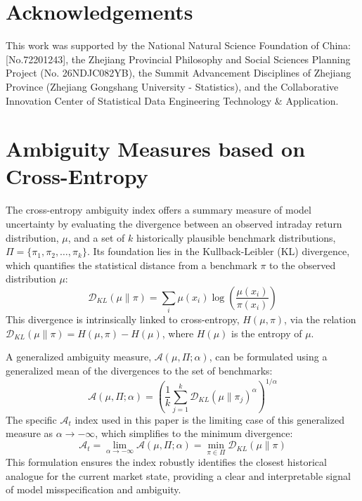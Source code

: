 \documentclass[preprint,12pt,authoryear]{elsarticle}
\begin{document}



\clearpage
\section*{Acknowledgements}
This work was supported by the National Natural Science Foundation of China:[No.72201243], the Zhejiang Provincial Philosophy and Social Sciences Planning Project (No. 26NDJC082YB), the Summit Advancement Disciplines of Zhejiang Province (Zhejiang Gongshang University - Statistics), and the Collaborative Innovation Center of Statistical Data Engineering Technology \& Application.

\appendix

\section{Ambiguity Measures based on Cross-Entropy}
The cross-entropy ambiguity index offers a summary measure of model uncertainty by evaluating the divergence between an observed intraday return distribution, $\mu$, and a set of $k$ historically plausible benchmark distributions, $\Pi = \{\pi_1, \pi_2, \dots, \pi_k\}$. Its foundation lies in the Kullback-Leibler (KL) divergence, which quantifies the statistical distance from a benchmark $\pi$ to the observed distribution $\mu$:
\begin{equation}
    \mathcal{D}_{KL}(\mu \| \pi) = \sum_{i} \mu(x_i) \log\left(\frac{\mu(x_i)}{\pi(x_i)}\right)
\end{equation}
This divergence is intrinsically linked to cross-entropy, $H(\mu, \pi)$, via the relation $\mathcal{D}_{KL}(\mu \| \pi) = H(\mu, \pi) - H(\mu)$, where $H(\mu)$ is the entropy of $\mu$.

A generalized ambiguity measure, $\mathcal{A}(\mu, \Pi; \alpha)$, can be formulated using a generalized mean of the divergences to the set of benchmarks:
\begin{equation}
    \mathcal{A}(\mu, \Pi; \alpha) = \left( \frac{1}{k} \sum_{j=1}^{k} \mathcal{D}_{KL}(\mu \| \pi_j)^{\alpha} \right)^{1/\alpha}
\end{equation}
The specific $\mathcal{A}_t$ index used in this paper is the limiting case of this generalized measure as $\alpha \to -\infty$, which simplifies to the minimum divergence:
\begin{equation}
    \mathcal{A}_t = \lim_{\alpha \to -\infty} \mathcal{A}(\mu, \Pi; \alpha) = \min_{\pi \in \Pi} \mathcal{D}_{KL}(\mu \| \pi)
\end{equation}
This formulation ensures the index robustly identifies the closest historical analogue for the current market state, providing a clear and interpretable signal of model misspecification and ambiguity.
\end{document}
